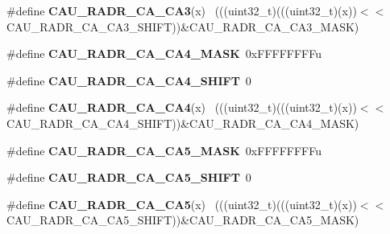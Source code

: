\begin{DoxyCompactItemize}
\item 
\hypertarget{group___c_a_u___register___masks_ga7946185095f76647bd1285b87c6ca7e7}{}\#define {\bfseries C\+A\+U\+\_\+\+R\+A\+D\+R\+\_\+\+C\+A\+\_\+\+C\+A3}(x)                                          ~(((uint32\+\_\+t)(((uint32\+\_\+t)(x))$<$$<$C\+A\+U\+\_\+\+R\+A\+D\+R\+\_\+\+C\+A\+\_\+\+C\+A3\+\_\+\+S\+H\+I\+F\+T))\&C\+A\+U\+\_\+\+R\+A\+D\+R\+\_\+\+C\+A\+\_\+\+C\+A3\+\_\+\+M\+A\+S\+K)\label{group___c_a_u___register___masks_ga7946185095f76647bd1285b87c6ca7e7}

\item 
\hypertarget{group___c_a_u___register___masks_ga9d0f7744ac9647b00fd84c95c76e763b}{}\#define {\bfseries C\+A\+U\+\_\+\+R\+A\+D\+R\+\_\+\+C\+A\+\_\+\+C\+A4\+\_\+\+M\+A\+S\+K}~0x\+F\+F\+F\+F\+F\+F\+F\+Fu\label{group___c_a_u___register___masks_ga9d0f7744ac9647b00fd84c95c76e763b}

\item 
\hypertarget{group___c_a_u___register___masks_gaeb4fe1e9be3bcb2b1ac74660b92e9a4b}{}\#define {\bfseries C\+A\+U\+\_\+\+R\+A\+D\+R\+\_\+\+C\+A\+\_\+\+C\+A4\+\_\+\+S\+H\+I\+F\+T}~0\label{group___c_a_u___register___masks_gaeb4fe1e9be3bcb2b1ac74660b92e9a4b}

\item 
\hypertarget{group___c_a_u___register___masks_gaec3b9a90b83fbbf53bd8adc180c0ce26}{}\#define {\bfseries C\+A\+U\+\_\+\+R\+A\+D\+R\+\_\+\+C\+A\+\_\+\+C\+A4}(x)                                          ~(((uint32\+\_\+t)(((uint32\+\_\+t)(x))$<$$<$C\+A\+U\+\_\+\+R\+A\+D\+R\+\_\+\+C\+A\+\_\+\+C\+A4\+\_\+\+S\+H\+I\+F\+T))\&C\+A\+U\+\_\+\+R\+A\+D\+R\+\_\+\+C\+A\+\_\+\+C\+A4\+\_\+\+M\+A\+S\+K)\label{group___c_a_u___register___masks_gaec3b9a90b83fbbf53bd8adc180c0ce26}

\item 
\hypertarget{group___c_a_u___register___masks_ga042e25609d552ff6fab834eb7ef16ace}{}\#define {\bfseries C\+A\+U\+\_\+\+R\+A\+D\+R\+\_\+\+C\+A\+\_\+\+C\+A5\+\_\+\+M\+A\+S\+K}~0x\+F\+F\+F\+F\+F\+F\+F\+Fu\label{group___c_a_u___register___masks_ga042e25609d552ff6fab834eb7ef16ace}

\item 
\hypertarget{group___c_a_u___register___masks_gad8bf0b422addabdffbfde146a1d601b3}{}\#define {\bfseries C\+A\+U\+\_\+\+R\+A\+D\+R\+\_\+\+C\+A\+\_\+\+C\+A5\+\_\+\+S\+H\+I\+F\+T}~0\label{group___c_a_u___register___masks_gad8bf0b422addabdffbfde146a1d601b3}

\item 
\hypertarget{group___c_a_u___register___masks_ga24f899dea3bdf7dbd86737d1ae758476}{}\#define {\bfseries C\+A\+U\+\_\+\+R\+A\+D\+R\+\_\+\+C\+A\+\_\+\+C\+A5}(x)                                          ~(((uint32\+\_\+t)(((uint32\+\_\+t)(x))$<$$<$C\+A\+U\+\_\+\+R\+A\+D\+R\+\_\+\+C\+A\+\_\+\+C\+A5\+\_\+\+S\+H\+I\+F\+T))\&C\+A\+U\+\_\+\+R\+A\+D\+R\+\_\+\+C\+A\+\_\+\+C\+A5\+\_\+\+M\+A\+S\+K)\label{group___c_a_u___register___masks_ga24f899dea3bdf7dbd86737d1ae758476}


\end{DoxyCompactItemize}
